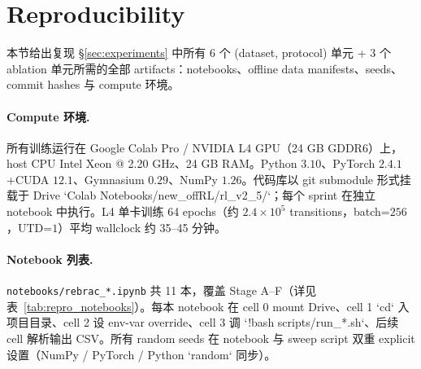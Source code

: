 %
%

\appendix

\section{Reproducibility}\label{app:repro}

本节给出复现 \S\ref{sec:experiments} 中所有 6 个 (dataset, protocol) 单元 + 3 个 ablation 单元所需的全部 artifacts：notebooks、offline data manifests、seeds、commit hashes 与 compute 环境。

\paragraph{Compute 环境.}\quad
所有训练运行在 Google Colab Pro / NVIDIA L4 GPU（24 GB GDDR6）上，host CPU Intel Xeon @ 2.20 GHz、24 GB RAM。Python $3.10$、PyTorch $2.4.1$+CUDA $12.1$、Gymnasium $0.29$、NumPy $1.26$。代码库以 git submodule 形式挂载于 Drive `Colab Notebooks/new\_offRL/rl\_v2\_5/`；每个 sprint 在独立 notebook 中执行。L4 单卡训练 64 epochs（约 $2.4\times 10^5$ transitions，batch=$256$，UTD=$1$）平均 wallclock 约 35--45 分钟。

\paragraph{Notebook 列表.}\quad
\texttt{notebooks/rebrac\_*.ipynb} 共 11 本，覆盖 Stage A--F（详见表~\ref{tab:repro_notebooks}）。每本 notebook 在 cell 0 mount Drive、cell 1 `cd` 入项目目录、cell 2 设 env-var override、cell 3 调 `!bash scripts/run\_*.sh`、后续 cell 解析输出 CSV。所有 random seeds 在 notebook 与 sweep script 双重 explicit 设置（NumPy / PyTorch / Python `random` 同步）。

